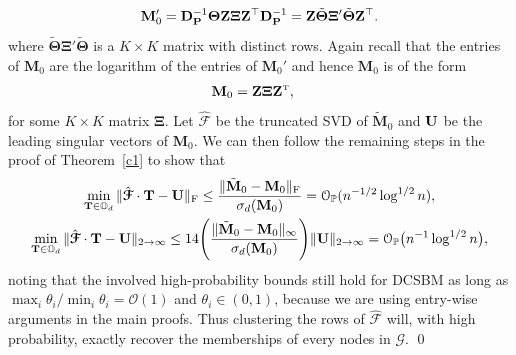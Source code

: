 \documentclass[10pt,journal,compsoc]{IEEEtran}
\newcommand{\op}{\mathcal{O}_{\mathbb{P}}}
\newcommand{\ee}{\end{aligned} \end{equation}}
\newcommand{\bds}{\boldsymbol}
\newcommand{\twoinf}{2\rightarrow \infty}
\newcommand{\T}{\top}
\def\T{{ \mathrm{\scriptscriptstyle T} }} %
\newcommand{\bee}{\begin{equation}\begin{aligned}}
\newcommand{\M}[1]{{{\mathbf{\MakeUppercase{#1}}}}}
\newcommand{\F}{\mathrm{F}}
\numberwithin{equation}{section}
\begin{document}
$$\mathbf{M}'_0 = \M D_{\M P}^{-1} \bm{\Theta} \M Z \bm{\Xi} \M Z^{\top} \M D_{\M P}^{-1} = \M Z \tilde{\bm{\Theta}} \bm{\Xi}' \tilde{\bm{\Theta}} \M Z^{\top}.$$
where $\tilde{\bm{\Theta}} \bm{\Xi}' \tilde{\bm{\Theta}}$ is a $K \times K$ matrix with distinct rows. Again recall that the entries of $\mathbf{M}_0$ are the logarithm of the entries of $\mathbf{M}_0'$ and hence $\mathbf{M}_0$ is of the form
\bee\nonumber
\M M_0 &=  
\M Z  \bm{\Xi} \M Z^\T,
\ee
for some $K\times K$ matrix $\bm{\Xi}$. Let $\hat{\mathcal{F}}$ be the truncated SVD of $\tilde{\mathbf{M}}_0$ and $\M U$ be the leading singular vectors of $\mathbf{M}_0$.
We can then follow the remaining steps in the proof of Theorem~\ref{c1} to show that 
\begin{gather*}
\min_{\M T \in \mathbb{O}_{d}} \|\hat{\bds{\mathcal{F}}} \cdot \mathbf{T} - \mathbf{U}\|_{\F}  \leq  \frac{\|\tilde{\M M}_0 - \M M_0\|_\F}{\sigma_d(\M M_0)} = \op(n^{-1/2}\log^{1/2}{n}), \\
\min_{\M T \in \mathbb{O}_{d}} \|\hat{\bds{\mathcal{F}}} \cdot \mathbf{T} - \mathbf{U}\|_{\twoinf} \leq 14\Bigg(\frac{\|\tilde{\M M}_0 - \M M_0\|_{\infty}}{\sigma_d(\M M_0)}\Bigg)\|\M U\|_{\twoinf} = \mathcal{O}_{\mathbb{P}}\big(n^{-1}\log^{1/2}{n}\big),
\end{gather*}
{\color{black}noting that the involved high-probability bounds still hold for DCSBM as long as $\max_i \theta_i /\min_i \theta_i = \mathcal{O}(1)$ and $\theta_i \in (0,1)$, because we are using entry-wise arguments in the main proofs}. Thus clustering the rows of $\hat{\mathcal{F}}$ will, with high probability, exactly recover the memberships of every nodes in $\mathcal{G}$. \qed
\end{document}
